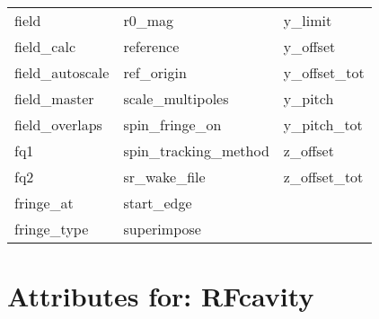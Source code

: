 \begin{tabular}{lll}
field                       & r0_mag                      & y_limit                     \\
field_calc                  & reference                   & y_offset                    \\
field_autoscale                & ref_origin                  & y_offset_tot                \\
field_master                & scale_multipoles            & y_pitch                     \\
field_overlaps              & spin_fringe_on              & y_pitch_tot                 \\
fq1                         & spin_tracking_method        & z_offset                    \\
fq2                         & sr_wake_file                & z_offset_tot                \\
fringe_at                   & start_edge                  &                             \\
fringe_type                 & superimpose                 &                             \\
 \bottomrule
 \end{tabular}
 \vfill
 
 \section{Attributes for: RFcavity}
 \label{s:list.rfcavity}
 
